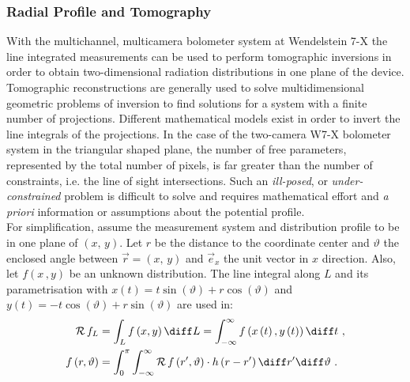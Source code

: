             \subsubsection*{Radial Profile and Tomography}%
%
                With the multichannel, multicamera bolometer system at Wendelstein 7-X the line integrated measurements can be used to perform tomographic inversions in order to obtain two-dimensional radiation distributions in one plane of the device. Tomographic reconstructions are generally used to solve multidimensional geometric problems of inversion to find solutions for a system with a finite number of projections. Different mathematical models exist in order to invert the line integrals of the projections. In the case of the two-camera W7-X bolometer system in the triangular shaped plane, the number of free parameters, represented by the total number of pixels, is far greater than the number of constraints, i.e. the line of sight intersections. Such an \textit{ill-posed}, or \textit{under-constrained} problem is difficult to solve and requires mathematical effort and \textit{a priori} information or assumptions about the potential profile.\\%
                For simplification, assume the measurement system and distribution profile to be in one plane of $\left(x,\,y\right)$. Let $r$ be the distance to the coordinate center and $\vartheta$ the enclosed angle between $\vec{r}=\left(x,\,y\right)$ and $\vec{e}_{x}$ the unit vector in $x$ direction. Also, let $f\left(x\,,y\right)$ be an unknown distribution. The line integral along $L$ and its parametrisation with $x\left(t\right)=t\sin\left(\vartheta\right)+r\cos\left(\vartheta\right)$ and $y\left(t\right)=-t\cos\left(\vartheta\right)+r\sin\left(\vartheta\right)$ are used in:%
%
                \begin{align}%
                    \begin{split}\label{eq:radon_transform}%
                        \mathcal{R}\,f_{L}&=\int_{L}f\left(x,y\right)\diff L=\int_{-\infty}^{\infty}f\left(x\left(t\right),y\left(t\right)\right)\diff t\,\,,\\%
                        f\left(r,\vartheta\right)&=\int_{0}^{\pi}\int_{-\infty}^{\infty}\mathcal{R}\,f\left(r^{\prime},\vartheta\right)\cdot h\left(r-r^{\prime}\right)\diff r^{\prime}\diff\vartheta\,\,.%
                    \end{split}%
                \end{align}%
%
